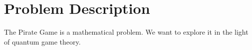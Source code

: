 \section{Problem Description}
\label{sec:int_problem}

The Pirate Game is a mathematical problem. We want to explore it in the light of quantum game theory.